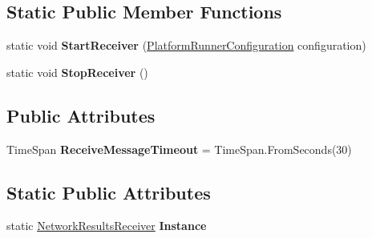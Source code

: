 \subsection*{Static Public Member Functions}
\begin{DoxyCompactItemize}
\item 
\mbox{\label{class_unity_test_1_1_network_results_receiver_a482af581655df02ec7bab919bc4ecf47}} 
static void {\bfseries Start\+Receiver} (\hyperlink{class_platform_runner_configuration}{Platform\+Runner\+Configuration} configuration)
\item 
\mbox{\label{class_unity_test_1_1_network_results_receiver_a289d1821a0b018f86e5f4bfb87d6f7f8}} 
static void {\bfseries Stop\+Receiver} ()
\end{DoxyCompactItemize}
\subsection*{Public Attributes}
\begin{DoxyCompactItemize}
\item 
\mbox{\label{class_unity_test_1_1_network_results_receiver_abb98d54d84ee4f137ff1dde915be9251}} 
Time\+Span {\bfseries Receive\+Message\+Timeout} = Time\+Span.\+From\+Seconds(30)
\end{DoxyCompactItemize}
\subsection*{Static Public Attributes}
\begin{DoxyCompactItemize}
\item 
\mbox{\label{class_unity_test_1_1_network_results_receiver_a932ea5096c5151b5f4eca694ef11ebf7}} 
static \hyperlink{class_unity_test_1_1_network_results_receiver}{Network\+Results\+Receiver} {\bfseries Instance}
\end{DoxyCompactItemize}
